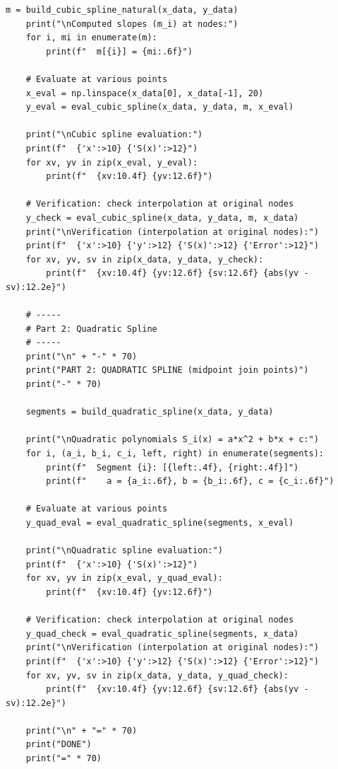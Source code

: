 \documentclass[14pt,a4paper]{extarticle}
\begin{document}
\begin{lstlisting}[caption={Файл lab3.py}, label={lst:lab3code}]
    m = build_cubic_spline_natural(x_data, y_data)
    print("\nComputed slopes (m_i) at nodes:")
    for i, mi in enumerate(m):
        print(f"  m[{i}] = {mi:.6f}")

    # Evaluate at various points
    x_eval = np.linspace(x_data[0], x_data[-1], 20)
    y_eval = eval_cubic_spline(x_data, y_data, m, x_eval)

    print("\nCubic spline evaluation:")
    print(f"  {'x':>10} {'S(x)':>12}")
    for xv, yv in zip(x_eval, y_eval):
        print(f"  {xv:10.4f} {yv:12.6f}")

    # Verification: check interpolation at original nodes
    y_check = eval_cubic_spline(x_data, y_data, m, x_data)
    print("\nVerification (interpolation at original nodes):")
    print(f"  {'x':>10} {'y':>12} {'S(x)':>12} {'Error':>12}")
    for xv, yv, sv in zip(x_data, y_data, y_check):
        print(f"  {xv:10.4f} {yv:12.6f} {sv:12.6f} {abs(yv - sv):12.2e}")

    # -----
    # Part 2: Quadratic Spline
    # -----
    print("\n" + "-" * 70)
    print("PART 2: QUADRATIC SPLINE (midpoint join points)")
    print("-" * 70)

    segments = build_quadratic_spline(x_data, y_data)

    print("\nQuadratic polynomials S_i(x) = a*x^2 + b*x + c:")
    for i, (a_i, b_i, c_i, left, right) in enumerate(segments):
        print(f"  Segment {i}: [{left:.4f}, {right:.4f}]")
        print(f"    a = {a_i:.6f}, b = {b_i:.6f}, c = {c_i:.6f}")

    # Evaluate at various points
    y_quad_eval = eval_quadratic_spline(segments, x_eval)

    print("\nQuadratic spline evaluation:")
    print(f"  {'x':>10} {'S(x)':>12}")
    for xv, yv in zip(x_eval, y_quad_eval):
        print(f"  {xv:10.4f} {yv:12.6f}")

    # Verification: check interpolation at original nodes
    y_quad_check = eval_quadratic_spline(segments, x_data)
    print("\nVerification (interpolation at original nodes):")
    print(f"  {'x':>10} {'y':>12} {'S(x)':>12} {'Error':>12}")
    for xv, yv, sv in zip(x_data, y_data, y_quad_check):
        print(f"  {xv:10.4f} {yv:12.6f} {sv:12.6f} {abs(yv - sv):12.2e}")

    print("\n" + "=" * 70)
    print("DONE")
    print("=" * 70)
\end{lstlisting}
\end{document}
